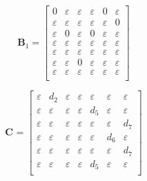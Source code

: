 \documentclass[11pt, a4paper, fleqn]{article}
\begin{document}
\begin{equation*}
\mathbf{B}_{1} = 
\left[\begin{array}{ cccccc }
0	&\varepsilon	&\varepsilon	&\varepsilon	&0	&\varepsilon\\
\varepsilon	&\varepsilon	&\varepsilon	&\varepsilon	&\varepsilon	&0\\
\varepsilon	&0	&\varepsilon	&0	&\varepsilon	&\varepsilon\\
\varepsilon	&\varepsilon	&\varepsilon	&\varepsilon	&\varepsilon	&\varepsilon\\
\varepsilon	&\varepsilon	&\varepsilon	&\varepsilon	&\varepsilon	&\varepsilon\\
\varepsilon	&\varepsilon	&0	&\varepsilon	&\varepsilon	&\varepsilon\\
\varepsilon	&\varepsilon	&\varepsilon	&\varepsilon	&\varepsilon	&\varepsilon\\
\end{array}\right]
\end{equation*}

\begin{equation*}
\mathbf{C}_{{}} = 
\left[\begin{array}{ ccccccc }
\varepsilon	&d_2	&\varepsilon	&\varepsilon	&\varepsilon	&\varepsilon	&\varepsilon\\
\varepsilon	&\varepsilon	&\varepsilon	&\varepsilon	&d_5	&\varepsilon	&\varepsilon\\
\varepsilon	&\varepsilon	&\varepsilon	&\varepsilon	&\varepsilon	&\varepsilon	&d_7\\
\varepsilon	&\varepsilon	&\varepsilon	&\varepsilon	&\varepsilon	&d_6	&\varepsilon\\
\varepsilon	&\varepsilon	&\varepsilon	&\varepsilon	&\varepsilon	&\varepsilon	&d_7\\
\varepsilon	&\varepsilon	&\varepsilon	&\varepsilon	&d_5	&\varepsilon	&\varepsilon\\
\end{array}\right]
\end{equation*}
\end{document}
